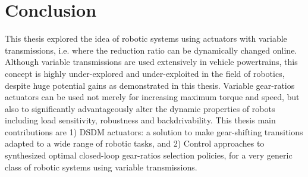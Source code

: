 \chapter{Conclusion}
\label{sec:Conclusion}








This thesis explored the idea of robotic systems using actuators with variable transmissions, i.e. where the reduction ratio can be dynamically changed online. Although variable transmissions are used extensively in vehicle powertrains, this concept is highly under-explored and under-exploited in the field of robotics, despite huge potential gains as demonstrated in this thesis. Variable gear-ratios actuators can be used not merely for increasing maximum torque and speed, but also to significantly advantageously alter the dynamic properties of robots including load sensitivity, robustness and backdrivability. This thesis main contributions are 1) DSDM actuators: a solution to make gear-shifting transitions adapted to a wide range of robotic tasks, and 2) Control approaches to synthesized optimal closed-loop gear-ratios selection policies, for a very generic class of robotic systems using variable transmissions.

